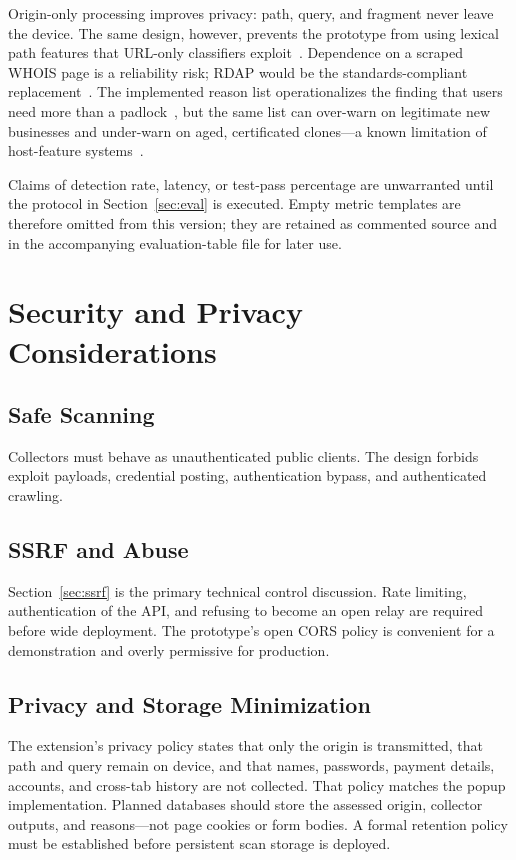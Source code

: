 \documentclass[conference]{IEEEtran}
\begin{document}
Origin-only processing improves privacy: path, query, and fragment never leave the device. The same design, however, prevents the prototype from using lexical path features that URL-only classifiers exploit~\cite{sahingoz2019ml}. Dependence on a scraped WHOIS page is a reliability risk; RDAP would be the standards-compliant replacement~\cite{rfc7480}. The implemented reason list operationalizes the finding that users need more than a padlock~\cite{dhamija2006why}, but the same list can over-warn on legitimate new businesses and under-warn on aged, certificated clones---a known limitation of host-feature systems~\cite{xiang2011cantinaplus,lin2021phishpedia}.

Claims of detection rate, latency, or test-pass percentage are unwarranted until the protocol in Section~\ref{sec:eval} is executed. Empty metric templates are therefore omitted from this version; they are retained as commented source and in the accompanying evaluation-table file for later use.

\section{Security and Privacy Considerations}
\label{sec:privacy}

\subsection{Safe Scanning}
Collectors must behave as unauthenticated public clients. The design forbids exploit payloads, credential posting, authentication bypass, and authenticated crawling.

\subsection{SSRF and Abuse}
Section~\ref{sec:ssrf} is the primary technical control discussion. Rate limiting, authentication of the API, and refusing to become an open relay are required before wide deployment. The prototype's open CORS policy is convenient for a demonstration and overly permissive for production.

\subsection{Privacy and Storage Minimization}
The extension's privacy policy states that only the origin is transmitted, that path and query remain on device, and that names, passwords, payment details, accounts, and cross-tab history are not collected. That policy matches the popup implementation. Planned databases should store the assessed origin, collector outputs, and reasons---not page cookies or form bodies. A formal retention policy must be established before persistent scan storage is deployed.
\end{document}
